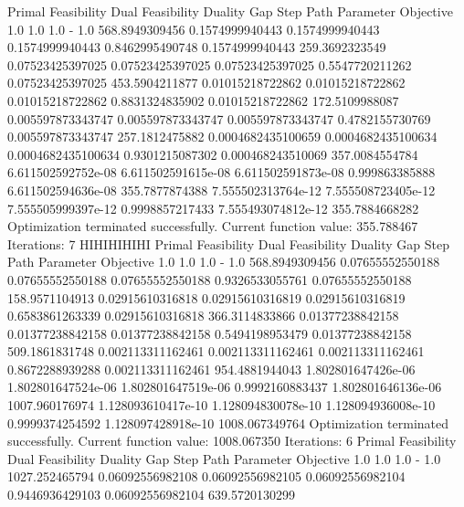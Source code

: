 \documentclass[letterpaper,10pt,english]{sphinxmanual}
\begin{document}
{
\begin{sphinxVerbatim}[commandchars=\\\{\}]
Primal Feasibility  Dual Feasibility    Duality Gap         Step             Path Parameter      Objective
1.0                 1.0                 1.0                 -                1.0                 568.8949309456
0.1574999940443     0.1574999940443     0.1574999940443     0.8462995490748  0.1574999940443     259.3692323549
0.07523425397025    0.07523425397025    0.07523425397025    0.5547720211262  0.07523425397025    453.5904211877
0.01015218722862    0.01015218722862    0.01015218722862    0.8831324835902  0.01015218722862    172.5109988087
0.005597873343747   0.005597873343747   0.005597873343747   0.4782155730769  0.005597873343747   257.1812475882
0.0004682435100659  0.0004682435100634  0.0004682435100634  0.9301215087302  0.000468243510069   357.0084554784
6.611502592752e-08  6.611502591615e-08  6.611502591873e-08  0.999863385888   6.611502594636e-08  355.7877874388
7.555502313764e-12  7.555508723405e-12  7.555505999397e-12  0.9998857217433  7.555493074812e-12  355.7884668282
Optimization terminated successfully.
         Current function value: 355.788467
         Iterations: 7
HIHIHIHIHI
Primal Feasibility  Dual Feasibility    Duality Gap         Step             Path Parameter      Objective
1.0                 1.0                 1.0                 -                1.0                 568.8949309456
0.07655552550188    0.07655552550188    0.07655552550188    0.9326533055761  0.07655552550188    158.9571104913
0.02915610316818    0.02915610316819    0.02915610316819    0.6583861263339  0.02915610316818    366.3114833866
0.01377238842158    0.01377238842158    0.01377238842158    0.5494198953479  0.01377238842158    509.1861831748
0.002113311162461   0.002113311162461   0.002113311162461   0.8672288939288  0.002113311162461   954.4881944043
1.802801647426e-06  1.802801647524e-06  1.802801647519e-06  0.9992160883437  1.802801646136e-06  1007.960176974
1.128093610417e-10  1.128094830078e-10  1.128094936008e-10  0.9999374254592  1.128097428918e-10  1008.067349764
Optimization terminated successfully.
         Current function value: 1008.067350
         Iterations: 6
Primal Feasibility  Dual Feasibility    Duality Gap         Step             Path Parameter      Objective
1.0                 1.0                 1.0                 -                1.0                 1027.252465794
0.06092556982108    0.06092556982105    0.06092556982104    0.9446936429103  0.06092556982104    639.5720130299

\end{sphinxVerbatim}}
\end{document}
